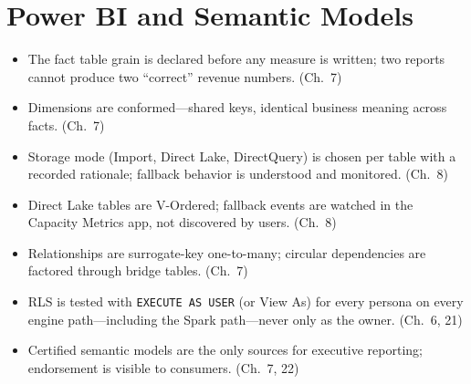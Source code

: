\section{Power BI and Semantic Models}
%
\begin{itemize}
    \item[$\square$] The fact table grain is declared before any measure is written; two
    reports cannot produce two ``correct'' revenue numbers. (Ch.~7)
    \item[$\square$] Dimensions are conformed---shared keys, identical business meaning across
    facts. (Ch.~7)
    \item[$\square$] Storage mode (Import, Direct Lake, DirectQuery) is chosen per table with a
    recorded rationale; fallback behavior is understood and monitored. (Ch.~8)
    \item[$\square$] Direct Lake tables are V-Ordered; fallback events are watched in the
    Capacity Metrics app, not discovered by users. (Ch.~8)
    \item[$\square$] Relationships are surrogate-key one-to-many; circular dependencies are
    factored through bridge tables. (Ch.~7)
    \item[$\square$] RLS is tested with \texttt{EXECUTE AS USER} (or View As) for every persona
    on every engine path---including the Spark path---never only as the owner. (Ch.~6, 21)
    \item[$\square$] Certified semantic models are the only sources for executive reporting;
    endorsement is visible to consumers. (Ch.~7, 22)
\end{itemize}


